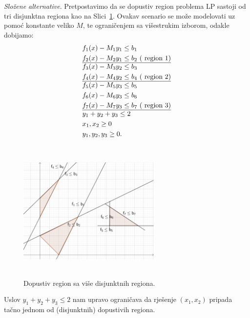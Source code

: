 \documentclass[a4paper, utf8, 11pt, colorlinks]{book}
\begin{document}
\emph{Složene alternative}. Pretpostavimo da se dopustiv region problema LP sastoji od tri disjunktna regiona kao na Slici~\ref{fig:compound_regions}. Ovakav scenario se može modelovati uz pomoć konstante veliko $M$, te  ograničenjem sa višestrukim izborom, odakle dobijamo:
\begin{align*}
    &f_1(x) - M_1 y_1 \leq b_1 \\
    &f_2(x) - M_2 y_1 \leq b_2\ (\mbox{ region 1}) \\ \hline
    & f_3(x) - M_3 y_2 \leq b_3 \\ 
    & f_4(x) - M_4 y_2 \leq b_4\ (\mbox{ region 2})\\  \hline 
    & f_5(x) - M_5 y_3 \leq b_5 \\
    & f_6(x) - M_6 y_3 \leq b_6 \\
    & f_7(x) - M_7 y_3 \leq b_7\ (\mbox{ region 3}) \\ \hline
    & y_1 + y_2 + y_3 \leq 2 \\
    & x_1, x_2 \geq 0 \\
    & y_1, y_2, y_3 \geq 0.
\end{align*}

\begin{figure}[!ht]
    \centering
    \includegraphics[width=200pt, height=200pt]{compound.eps}
    \caption{Dopustiv region sa više disjunktnih regiona.}
    \label{fig:compound_regions}
\end{figure}
Uslov $y_1 + y_2 + y_3 \leq 2$ nam upravo ograničava da rješenje $(x_1, x_2)$ pripada tačno jednom od (disjunktnih) dopustivih regiona. 
\end{document}
